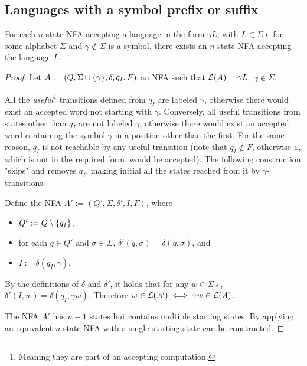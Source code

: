 \subsection{Languages with a symbol prefix or suffix}

\begin{thrm}
	For each $n$-state NFA accepting a language in the form $\gamma L$, with $L\in\Sigma\star$ for some alphabet $\Sigma$ and $\gamma\notin\Sigma$ is a symbol, there exists an $n$-state NFA accepting the language $L$.
\end{thrm}
\begin{proof}
	Let $A:=(Q,\Sigma\cup\{\gamma\},\delta,q_I,F)$ an NFA such that $\mathcal L(A)=\gamma L$, $\gamma\notin\Sigma$.

	All the \emph{useful}\footnote{Meaning they are part of an accepting computation.} transitions defined from $q_I$ are labeled $\gamma$, otherwise there would exist an accepted word not starting with $\gamma$.
	Conversely, all useful transitions from states other than $q_I$ are not labeled $\gamma$, otherwise there would exist an accepted word containing the symbol $\gamma$ in a position other than the first.
	For the same reason, $q_I$ is not reachable by any useful transition (note that $q_I\notin F$, otherwise $\varepsilon$, which is not in the required form, would be accepted).
	The following construction "skips" and removes $q_I$, making initial all the states reached from it by $\gamma$-transitions.

	Define the NFA $A':=(Q',\Sigma,\delta',I,F)$, where
	\begin{itemize}
		\item $Q':=Q\setminus\{q_I\}$,
		\item for each $q\in Q'$ and $\sigma\in\Sigma$, $\delta'(q,\sigma)=\delta(q,\sigma)$, and
		\item $I:=\delta(q_I,\gamma)$.
	\end{itemize}

	By the definitions of $\delta$ and $\delta'$, it holds that for any $w\in\Sigma\star$, $\delta'(I,w)=\delta(q_I,\gamma w)$.
	Therefore $w\in\mathcal L(A')\iff \gamma w\in\mathcal L(A)$.

	The NFA $A'$ has $n-1$ states but contains multiple starting states. By applying  an equivalent $n$-state NFA with a single starting state can be constructed.
\end{proof}


